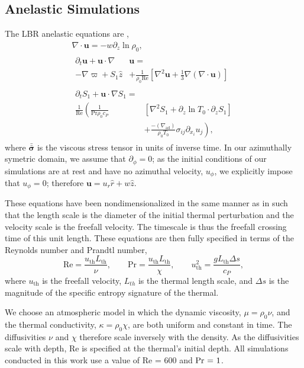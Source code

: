 \documentclass[twocolumn, amsmath, amsfonts, amssymb, trackchanges]{aastex62}
\newcommand{\DivU}{\ensuremath{\nabla\cdot\bm{u}}}
\newcommand{\grad}{\ensuremath{\nabla}}
\newcommand{\lilstressT}{\ensuremath{\bm{\bar{\bar{\sigma}}}}}
\begin{document}
\subsection{Anelastic Simulations}
The LBR anelastic equations are \citep{lecoanet&all2014},
\begin{gather}
\DivU = -w \partial_z \ln\rho_0, \\
\begin{split}
\partial_t \bm{u} + \bm{u}\cdot\grad&\bm{u} = \\
- \grad \varpi + S_1\hat{z} &
+ \frac{1}{\rho_0\text{Re}}\left[\grad^2 \bm{u} + \frac{1}{3}\grad(\DivU)\right] 
\end{split}\\
\begin{split}
\partial_t S_1 + \bm{u}\cdot\grad S_1 =& \\
\frac{1}{\text{Re}}\left(\frac{1}{\text{Pr}\rho_0c_P }\right.&[\grad^2 S_1 + \partial_z\ln T_0 \cdot\partial_z S_1]\\
&+ \left.\frac{-(\grad_{\text{ad}})}{\rho_0 T_0}\sigma_{ij}\partial_{x_i}u_j \right),
\end{split}
\end{gather}
where $\lilstressT$ is the viscous stress tensor in units of inverse time.
In our azimuthally symetric domain, we assume that $\partial_\phi = 0$; as the initial conditions of our simulations are at rest and have no azimuthal velocity, $u_\phi$, we explicitly impose that $u_\phi = 0$; therefore $\bm{u} = u_r \hat{r} + w\hat{z}$. 

These equations have been nondimensionalized in the same manner as in \citet{lecoanet&jeevanjee2018} such that the length scale is the diameter of the initial thermal perturbation and the velocity scale is the freefall velocity. 
The timescale is thus the freefall crossing time of this unit length. 
These equations are then fully specified in terms of the Reynolds number and Prandtl number,
\begin{equation}
\text{Re} = \frac{ u_{\text{th}} L_{\text{th}}}{\nu}, \qquad
\text{Pr} = \frac{ u_{\text{th}} L_{\text{th}}}{\chi}, \qquad
u_{\text{th}}^2 = \frac{g L_{\text{th}} \Delta s}{c_P},
\end{equation}
where $u_{\text{th}}$ is the freefall velocity, $L_{th}$ is the thermal length scale, and
$\Delta s$ is the magnitude of the specific entropy signature of the thermal.

We choose an atmospheric model in which the dynamic viscosity, $\mu = \rho_0 \nu$, and the thermal conductivity, $\kappa = \rho_0 \chi$, are both uniform and constant in time.
The diffusivities $\nu$ and $\chi$ therefore scale inversely with the density.
As the diffusivities scale with depth, Re is specified at the thermal's initial depth.
All simulations conducted in this work use a value of Re = 600 and $\mbox{\text{Pr} = 1}$.
\end{document}
